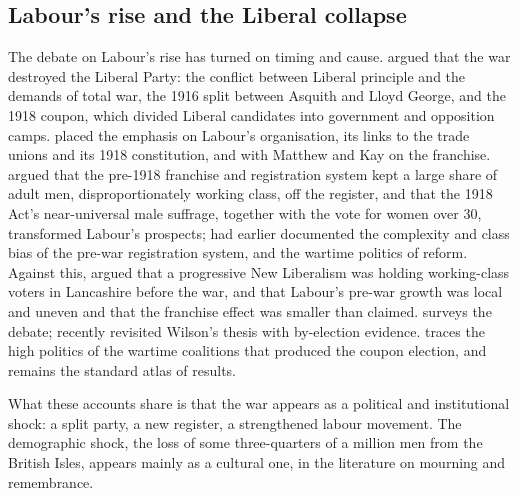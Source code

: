 \documentclass[11pt,a4paper]{article}
\begin{document}
\subsection{Labour's rise and the Liberal collapse}
The debate on Labour's rise has turned on timing and cause. \citet{wilson1966} argued that the war destroyed the Liberal Party: the conflict between Liberal principle and the demands of total war, the 1916 split between Asquith and Lloyd George, and the 1918 coupon, which divided Liberal candidates into government and opposition camps. \citet{mckibbin1974} placed the emphasis on Labour's organisation, its links to the trade unions and its 1918 constitution, and with Matthew and Kay on the franchise. \citet{matthew1976} argued that the pre-1918 franchise and registration system kept a large share of adult men, disproportionately working class, off the register, and that the 1918 Act's near-universal male suffrage, together with the vote for women over 30, transformed Labour's prospects; \citet{blewett1965} had earlier documented the complexity and class bias of the pre-war registration system, and \citet{pugh1978} the wartime politics of reform. Against this, \citet{clarke1971} argued that a progressive New Liberalism was holding working-class voters in Lancashire before the war, and \citet{tanner1990,tanner1991} that Labour's pre-war growth was local and uneven and that the franchise effect was smaller than claimed. \citet{laybourn1995} surveys the debate; \citet{steed2015} recently revisited Wilson's thesis with by-election evidence. \citet{turner1992} traces the high politics of the wartime coalitions that produced the coupon election, and \citet{kinnear1968} remains the standard atlas of results.

What these accounts share is that the war appears as a political and institutional shock: a split party, a new register, a strengthened labour movement. The demographic shock, the loss of some three-quarters of a million men from the British Isles, appears mainly as a cultural one, in the literature on mourning and remembrance.
\end{document}
